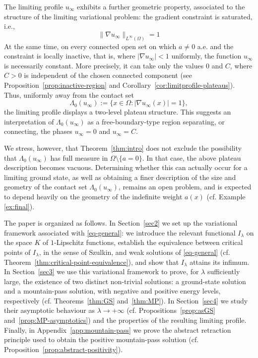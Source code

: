 \documentclass[11pt,reqno]{amsart}
\theoremstyle{plain}
\theoremstyle{definition}
\numberwithin{equation}{section}
\begin{document}
The limiting profile $u_\infty$ exhibits a further geometric property, associated to the structure of the limiting variational problem: the gradient constraint is saturated, i.e.,
$$
\|\nabla u_\infty\|_{L^\infty(\Omega)}=1
$$
At the same time, on every connected open set on which $a\neq0$ a.e. and the constraint is locally inactive, that is, where $|\nabla u_\infty|<1$ uniformly, the function $u_\infty$ is necessarily constant. More precisely, it can take only the values $0$ and $C$, where $C>0$ is independent of the chosen connected component (see Proposition~\ref{prop:inactive-region} and Corollary~\ref{cor:limitprofile-plateaus}). Thus, uniformly away from the contact set
$$
\Lambda_0(u_\infty):=\{x\in\Omega:|\nabla u_\infty(x)|=1\},
$$
the limiting profile displays a two-level plateau structure. This suggests an interpretation of $\Lambda_0(u_\infty)$ as a free-boundary-type region separating, or connecting, the phases ${u_\infty=0}$ and ${u_\infty=C}$.

We stress, however, that Theorem~\ref{thm:intro} does not exclude the possibility that $\Lambda_0(u_\infty)$ has full measure in $\Omega\setminus\{a=0\}$. In that case, the above plateau description becomes vacuous. Determining whether this can actually occur for a limiting ground state, as well as obtaining a finer description of the size and geometry of the contact set $\Lambda_0(u_\infty)$, remains an open problem, and is expected to depend heavily on the geometry of the indefinite weight $a(x)$ (cf. Example \ref{ex:final}).

The paper is organized as follows. In Section~\ref{sec2} we set up the variational framework associated with \eqref{eq-general}: we introduce the relevant functional $I_\lambda$ on the space $K$ of $1$-Lipschitz functions, establish the equivalence between critical points of $I_\lambda$, in the sense of Szulkin, and weak solutions of \eqref{eq-general} (cf. Theorem~\ref{thm:critical-point-equivalence}), and show that $I_\lambda$ attains its infimum. In Section~\ref{sec3} we use this variational framework to prove, for $\lambda$ sufficiently large, the existence of two distinct non-trivial solutions: a ground-state solution and a mountain-pass solution, with negative and positive energy levels, respectively (cf. Theorems~\ref{thm:GS} and~\ref{thm:MP}). In Section~\ref{sec4} we study their asymptotic behaviour as $\lambda\to+\infty$ (cf. Propositions~\ref{prop:asGS} and~\ref{prop:MP-asymptotics}) and the properties of the resulting limiting profile. Finally, in Appendix~\ref{app:mountain-pass} we prove the abstract retraction principle used to obtain the positive mountain-pass solution (cf. Proposition~\ref{prop:abstract-positivity}).
\end{document}
